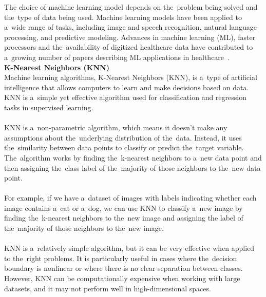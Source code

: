 The choice of machine learning model depends on the~problem being solved and the~type of data being used. Machine
learning models have been applied to a~wide range of tasks, including image and speech recognition, natural language
processing, and predictive modeling. Advances in machine learning (ML), faster processors and the~availability of
digitized healthcare data have contributed to a~growing number of papers describing ML applications in healthcare~\cite{Chen}.\\
\newpage
\noindent \textbf{K-Nearest Neighbors (KNN)} \label{sec:knn}\\
Machine learning algorithms, K-Nearest Neighbors (KNN), is a~type of artificial intelligence that allows
computers to learn and make decisions based on data. KNN is a~simple yet effective algorithm used for
classification and regression tasks in supervised learning.\\
\\
KNN is a~non-parametric algorithm, which means it doesn't make any assumptions about the~underlying
distribution of the~data. Instead, it uses the~similarity between data points to classify or predict the~target
variable. The~algorithm works by finding the~k-nearest neighbors to a~new data point and then assigning the~class
label of the~majority of those neighbors to the~new data point.\\
\\
For example, if we have a~dataset of images with labels indicating whether each image contains a~cat or a~dog,
we can use KNN to classify a~new image by finding the~k-nearest neighbors to the~new image and assigning the
label of the~majority of those neighbors to the~new image.\\
\\
KNN is a~relatively simple algorithm, but it can be very effective when applied to the~right problems.
It is particularly useful in cases where the~decision boundary is nonlinear or where there is no clear
separation between classes. However, KNN can be computationally expensive when working with large datasets, and
it may not perform well in high-dimensional spaces.



